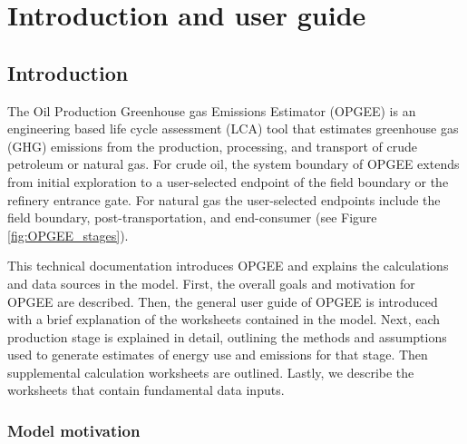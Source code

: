 \documentclass[11pt]{report}
\begin{document}




\part{Introduction and user guide}





\chapter{Introduction}

The Oil Production Greenhouse gas Emissions Estimator (OPGEE) is an engineering based life cycle assessment (LCA) tool that estimates greenhouse gas (GHG) emissions from the production, processing, and transport of crude petroleum or natural gas. For crude oil, the system boundary of OPGEE extends from initial exploration to a user-selected endpoint of the field boundary or the refinery entrance gate. For natural gas the user-selected endpoints include the field boundary, post-transportation, and end-consumer (see Figure \ref{fig:OPGEE_stages}).

This technical documentation introduces OPGEE and explains the calculations and data sources in the model. First, the overall goals and motivation for OPGEE are described. Then, the general user guide of OPGEE is introduced with a brief explanation of the worksheets contained in the model. Next, each production stage is explained in detail, outlining the methods and assumptions used to generate estimates of energy use and emissions for that stage. Then supplemental calculation worksheets are outlined. Lastly, we describe the worksheets that contain fundamental data inputs.


\clearpage

\section{Model motivation}
\end{document}
